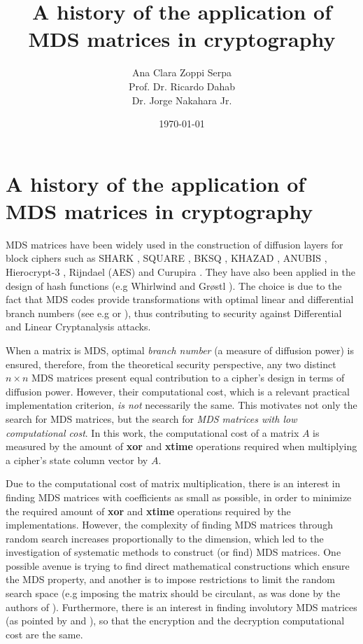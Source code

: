 \documentclass{report}
\title{A history of the application of MDS matrices in cryptography}
\author{Ana Clara Zoppi Serpa\\ Prof. Dr. Ricardo Dahab \\ Dr. Jorge Nakahara Jr.}
\date{\today}
\begin{document}

\maketitle

\tableofcontents

\chapter{A history of the application of MDS matrices in cryptography}

MDS matrices have been widely used in the construction of diffusion layers for block ciphers such as SHARK \cite{SHARK1996}, SQUARE \cite{SQUARE1997}, BKSQ \cite{BKSQ1998}, KHAZAD \cite{KHAZAD2000}, ANUBIS \cite{ANUBIS2000}, Hierocrypt-3 \cite{Hierocrypt2000}, Rijndael (AES) \cite{DesignOfRijndael2002} and Curupira \cite{barreto2007curupira}. They have also been applied in the design of hash functions (e.g Whirlwind \cite{Whirlwind2010} and Gr{\o}stl \cite{Grostl2009}). The choice is due to the fact that MDS codes provide transformations with optimal linear and differential branch numbers (see e.g \cite{SQUARE1997} or \cite{SHARK1996}), thus contributing to security against Differential and Linear Cryptanalysis attacks.

When a matrix is MDS, optimal \emph{branch number} (a measure of diffusion power) is ensured, therefore, from the theoretical security perspective, any two distinct $n \times n$ MDS matrices present equal contribution to a cipher's design in terms of diffusion power. However, their computational cost, which is a relevant practical implementation criterion, \emph{is not} necessarily the same. This motivates not only the search for MDS matrices, but the search for \emph{MDS matrices with low computational cost}. In this work, the computational cost of a matrix $A$ is measured by the amount of \textbf{xor} and \textbf{xtime} operations required when multiplying a cipher's state column vector by $A$.

Due to the computational cost of matrix multiplication, there is an interest in finding MDS matrices with coefficients as small as possible, in order to minimize the required amount of \textbf{xor} and \textbf{xtime} operations required by the implementations. However, the complexity of finding MDS matrices through random search increases proportionally to the dimension, which led to the investigation of systematic methods to construct (or find) MDS matrices. One possible avenue is trying to find direct mathematical constructions which ensure the MDS property, and another is to impose restrictions to limit the random search space (e.g imposing the matrix should be circulant, as was done by the authors of \cite{SQUARE1997}). Furthermore, there is an interest in finding involutory MDS matrices (as pointed by \cite{KHAZAD2000} and \cite{ANUBIS2000}), so that the encryption and the decryption computational cost are the same.
\end{document}
